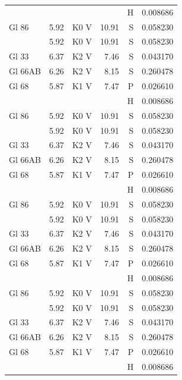 \documentclass{aa}
\begin{document}
{\begin{longtable}{lllrrr}
		          &         &          &          & H    & 0.008686   \\
		Gl 86     & 5.92    & K0 V     & 10.91    & S    & 0.058230   \\            & 5.92 & K0 V & 10.91& S & 0.058230\\
		Gl 33     & 6.37    & K2 V     & 7.46     & S    & 0.043170   \\
		Gl 66AB   & 6.26    & K2 V     & 8.15     & S    & 0.260478   \\
		Gl 68     & 5.87    & K1 V     & 7.47     & P    & 0.026610   \\
		          &         &          &          & H    & 0.008686   \\
		Gl 86     & 5.92    & K0 V     & 10.91    & S    & 0.058230   \\            & 5.92 & K0 V & 10.91& S & 0.058230\\
		Gl 33     & 6.37    & K2 V     & 7.46     & S    & 0.043170   \\
		Gl 66AB   & 6.26    & K2 V     & 8.15     & S    & 0.260478   \\
		Gl 68     & 5.87    & K1 V     & 7.47     & P    & 0.026610   \\
		          &         &          &          & H    & 0.008686   \\
		Gl 86     & 5.92    & K0 V     & 10.91    & S    & 0.058230   \\            & 5.92 & K0 V & 10.91& S & 0.058230\\
		Gl 33     & 6.37    & K2 V     & 7.46     & S    & 0.043170   \\
		Gl 66AB   & 6.26    & K2 V     & 8.15     & S    & 0.260478   \\
		Gl 68     & 5.87    & K1 V     & 7.47     & P    & 0.026610   \\
		          &         &          &          & H    & 0.008686   \\
		Gl 86     & 5.92    & K0 V     & 10.91    & S    & 0.058230   \\
		          & 5.92    & K0 V     & 10.91    & S    & 0.058230   \\
		Gl 33     & 6.37    & K2 V     & 7.46     & S    & 0.043170   \\
		Gl 66AB   & 6.26    & K2 V     & 8.15     & S    & 0.260478   \\
		Gl 68     & 5.87    & K1 V     & 7.47     & P    & 0.026610   \\
		          &         &          &          & H    & 0.008686   \\

\end{longtable}}
\end{document}
